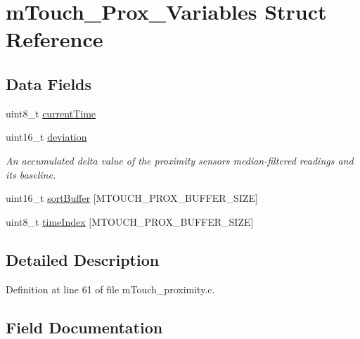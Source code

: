 \hypertarget{structm_touch___prox___variables}{}\section{m\+Touch\+\_\+\+Prox\+\_\+\+Variables Struct Reference}
\label{structm_touch___prox___variables}
\subsection*{Data Fields}
\begin{DoxyCompactItemize}
\item 
uint8\+\_\+t \hyperlink{structm_touch___prox___variables_a54e1af2c7842f193ade514a4bfee0189}{current\+Time}
\item 
uint16\+\_\+t \hyperlink{structm_touch___prox___variables_aacf98a544e351b33233e438f4a4aaf60}{deviation}
\begin{DoxyCompactList}\small\item\em An accumulated delta value of the proximity sensor\textquotesingle{}s median-\/filtered readings and its baseline. \end{DoxyCompactList}\item 
uint16\+\_\+t \hyperlink{structm_touch___prox___variables_a41839f2b4a6f1589d77351ff631df82c}{sort\+Buffer} \mbox{[}M\+T\+O\+U\+C\+H\+\_\+\+P\+R\+O\+X\+\_\+\+B\+U\+F\+F\+E\+R\+\_\+\+S\+I\+Z\+E\mbox{]}
\item 
uint8\+\_\+t \hyperlink{structm_touch___prox___variables_a38d7d57a2a2c5314834d62a066a3613c}{time\+Index} \mbox{[}M\+T\+O\+U\+C\+H\+\_\+\+P\+R\+O\+X\+\_\+\+B\+U\+F\+F\+E\+R\+\_\+\+S\+I\+Z\+E\mbox{]}
\end{DoxyCompactItemize}


\subsection{Detailed Description}


Definition at line 61 of file m\+Touch\+\_\+proximity.\+c.



\subsection{Field Documentation}
\hypertarget{structm_touch___prox___variables_a54e1af2c7842f193ade514a4bfee0189}{}

